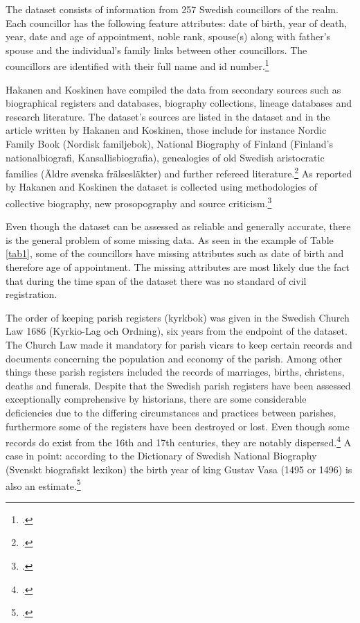 The dataset consists of information from 257 Swedish councillors of the realm. Each councillor has the following feature attributes: date of birth, year of death, year, date and age of appointment, noble rank, spouse(s) along with father's spouse and the individual's family links between other councillors. The councillors are identified with their full name and id number.\footcites[p. 48.]{HakanenAKoskinen2017}{councillorsDS}

Hakanen and Koskinen have compiled the data from secondary sources such as biographical registers and databases, biography collections, lineage databases and research literature. The dataset's sources are listed in the dataset and in the article written by Hakanen and Koskinen, those include for instance Nordic Family Book (Nordisk familjebok), National Biography of Finland (Finland's nationalbiografi, Kansallisbiografia), genealogies of old Swedish aristocratic families (Äldre svenska frälsesläkter) and further refereed literature.\footcites[p. 48, 76]{HakanenAKoskinen2017}{councillorsDS} As reported by Hakanen and Koskinen the dataset is collected using methodologies of collective biography, new prosopography and source criticism.\footcite[p. 48.]{HakanenAKoskinen2017}
  
Even though the dataset can be assessed as reliable and generally accurate, there is the general problem of some missing data. As seen in the example of Table \ref{tab1}, some of the councillors have missing attributes such as date of birth and therefore age of appointment. The missing attributes are most likely due the fact that during the time span of the dataset there was no standard of civil registration. 

The order of keeping parish registers (kyrkbok) was given in the Swedish Church Law 1686 (Kyrkio-Lag och Ordning), six years from the endpoint of the dataset. The Church Law made it mandatory for parish vicars to keep certain records and documents concerning the population and economy of the parish. Among other things these parish registers included the records of marriages, births, christens, deaths and funerals. Despite that the Swedish parish registers have been assessed exceptionally comprehensive by historians, there are some considerable deficiencies due to the differing circumstances and practices between parishes, furthermore some of the registers have been destroyed or lost. Even though some records do exist from the 16th and 17th centuries, they are notably dispersed.\footcite[pp. 169-176.]{viikki94} A case in point: according to the Dictionary of Swedish National Biography (Svenskt biografiskt lexikon) the birth year of king Gustav Vasa (1495 or 1496) is also an estimate.\footcite{sbl_gustav_v}

